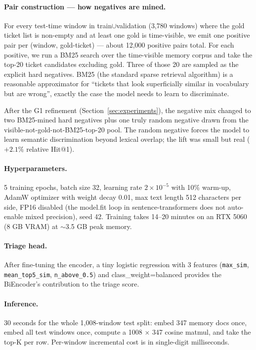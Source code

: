 \paragraph{Pair construction --- how negatives are mined.} For every test-time window in train$\cup$validation (3{,}780 windows) where the gold ticket list is non-empty and at least one gold is time-visible, we emit one positive pair per (window, gold-ticket) --- about 12{,}000 positive pairs total. For each positive, we run a BM25 search over the time-visible memory corpus and take the top-20 ticket candidates excluding gold. Three of those 20 are sampled as the explicit hard negatives. BM25 (the standard sparse retrieval algorithm) is a reasonable approximator for ``tickets that look superficially similar in vocabulary but are wrong'', exactly the case the model needs to learn to discriminate.

After the G1 refinement (Section~\ref{sec:experiments}), the negative mix changed to two BM25-mined hard negatives plus one truly random negative drawn from the visible-not-gold-not-BM25-top-20 pool. The random negative forces the model to learn semantic discrimination beyond lexical overlap; the lift was small but real ($+2.1\%$ relative Hit@1).

\paragraph{Hyperparameters.} 5 training epochs, batch size 32, learning rate $2 \times 10^{-5}$ with 10\% warm-up, AdamW optimizer with weight decay 0.01, max text length 512 characters per side, FP16 disabled (the model.fit loop in sentence-transformers does not auto-enable mixed precision), seed 42. Training takes 14--20 minutes on an RTX 5060 (8 GB VRAM) at $\sim$3.5 GB peak memory.

\paragraph{Triage head.} After fine-tuning the encoder, a tiny logistic regression with 3 features (\texttt{max\_sim}, \texttt{mean\_top5\_sim}, \texttt{n\_above\_0.5}) and class\_weight=balanced provides the BiEncoder's contribution to the triage score.

\paragraph{Inference.} 30 seconds for the whole 1{,}008-window test split: embed 347 memory docs once, embed all test windows once, compute a 1008 $\times$ 347 cosine matmul, and take the top-K per row. Per-window incremental cost is in single-digit milliseconds.

